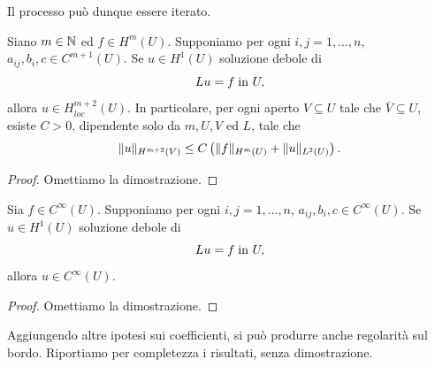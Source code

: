 Il processo può dunque essere iterato.
\begin{teorema}
	Siano $m \in \mathbb{N}$ ed $f \in H^m(U)$. Supponiamo per ogni $i,j=1,\dots,n$, $a_{ij},b_i,c \in C^{m+1}(U)$. Se $u \in H^1(U)$ soluzione debole di 
	\[ Lu= f \; \textup{in } U, \]
	allora $u \in H^{m+2}_{loc}(U)$. In particolare, per ogni aperto $V \subseteq U$ tale che $\overline{V} \subseteq U$, esiste $C>0$, dipendente solo da $m,U,V$ ed $L$, tale che 
	\[ \lVert u\rVert_{H^{m+2}(V)} \le C\left( \lVert f\rVert_{H^m(U)} + \lVert u\rVert_{L^2(U)}\right).   \]
\end{teorema}
\begin{proof}
	Omettiamo la dimostrazione.
\end{proof}
\begin{teorema}
	Sia $f \in C^\infty(U)$. Supponiamo per ogni $i,j=1,\dots,n$, $a_{ij},b_i,c \in C^\infty(U)$. Se $u \in H^1(U)$ soluzione debole di 
	\[ Lu= f \; \textup{in } U, \]
	allora $u \in C^\infty(U)$.
\end{teorema}
\begin{proof}
	Omettiamo la dimostrazione.
\end{proof}
Aggiungendo altre ipotesi sui coefficienti, si può produrre anche regolarità sul bordo. Riportiamo per completezza i risultati, senza dimostrazione.

